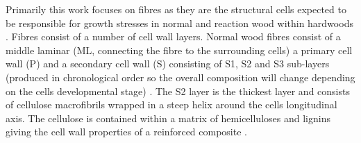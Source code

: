 Primarily this work focuses on fibres as they are the structural cells expected
to be responsible for growth stresses in normal and reaction wood within
hardwoods \citep{archer1987growth}. Fibres consist of a number of cell wall layers. Normal wood fibres
consist of a middle laminar (ML, connecting the fibre to
the surrounding cells) a primary cell wall (P) and a secondary cell wall (S) consisting of
S1, S2 and S3 sub-layers (produced in chronological order so the overall composition
will change depending on the cells developmental stage) \citep{barnett1981xylem}. The S2 layer is
the thickest layer and consists of cellulose macrofibrils wrapped in a steep helix
around the cells longitudinal axis. The cellulose is contained within a
matrix of hemicelluloses and lignins giving the cell wall properties
of a reinforced composite \citep{niklas2012plant}.